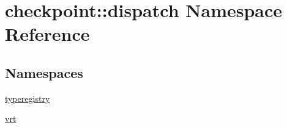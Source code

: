 \hypertarget{namespacecheckpoint_1_1dispatch}{}\section{checkpoint\+:\+:dispatch Namespace Reference}
\label{namespacecheckpoint_1_1dispatch}
\subsection*{Namespaces}
\begin{DoxyCompactItemize}
\item 
 \hyperlink{namespacecheckpoint_1_1dispatch_1_1typeregistry}{typeregistry}
\item 
 \hyperlink{namespacecheckpoint_1_1dispatch_1_1vrt}{vrt}
\end{DoxyCompactItemize}
